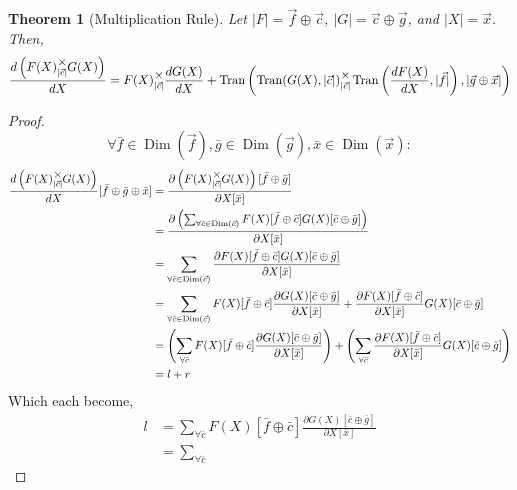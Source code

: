 \documentclass[12pt]{book}
\theoremstyle{definition}
\theoremstyle{plain}
\newtheorem{theorem}{Theorem}[chapter]
\theoremstyle{ppart}
\theoremstyle{case}
\theoremstyle{solution}
\DeclareMathOperator{\Dim}{Dim}
\DeclareMathOperator{\Tran}{Tran}
\newcommand{\mmult}[1]{\text{\raisebox{1ex}{$\underset{#1}{\times}$}}}
\begin{document}
\begin{landscape}
\begin{theorem}[Multiplication Rule]
\label{multiplication_rule}
Let $|F| = \vec{f} \oplus \vec{c}$, $|G| = \vec{c} \oplus \vec{g}$,
and $|X| = \vec{x}$. Then,
\begin{align*}
 \frac{d\left(F(X) \mmult{|\vec{c}|} G(X)\right)}{dX} =
 F(X) \mmult{|\vec{c}|} \frac{dG(X)}{dX} +
 \Tran\left(
   \Tran(G(X), |\vec{c}|)
     \mmult{|\vec{c}|}
   \Tran\left(\frac{dF(X)}{dX}, |\vec{f}|\right),
   |\vec{g} \oplus \vec{x}|
 \right)
\end{align*}
\end{theorem}
\begin{proof}
\[
 \forall
  \bar{f} \in \Dim(\vec{f}),
  \bar{g} \in \Dim(\vec{g}),
  \bar{x} \in \Dim(\vec{x})
 :
\]
\begin{align*}
 \frac{d\left(F(X) \mmult{|\vec{c}|} G(X)\right)}{dX}
  [\bar{f} \oplus \bar{g} \oplus \bar{x}]
 &= \frac{
       \partial \left(F(X) \mmult{|\vec{c}|} G(X)\right)[\bar{f} \oplus \bar{g}]
    }{
       \partial X[\bar{x}]
    } \\
 &= \frac{
       \partial \left(
        \sum_{\forall \bar{c} \in \Dim(\vec{c})}
         F(X)[\bar{f} \oplus \bar{c}] G(X)[\bar{c} \oplus \bar{g}]
      \right)
    }{
       \partial X[\bar{x}]
    } \\
 &= \sum_{\forall \bar{c} \in \Dim(\vec{c})}
    \frac{
      \partial F(X)[\bar{f} \oplus \bar{c}] G(X)[\bar{c} \oplus \bar{g}]
    }{
      \partial X[\bar{x}]
    }\\
 &= \sum_{\forall \bar{c} \in \Dim(\vec{c})}
    F(X)[\bar{f} \oplus \bar{c}]
    \frac{\partial G(X)[\bar{c} \oplus \bar{g}]}{\partial X[\bar{x}]}
    +
    \frac{\partial F(X)[\bar{f} \oplus \bar{c}]}{\partial X[\bar{x}]}
    G(X)[\bar{c} \oplus \bar{g}] \\
 &=
   \left(
    \sum_{\forall \bar{c}}
      F(X)[\bar{f} \oplus \bar{c}]
      \frac{\partial G(X)[\bar{c} \oplus \bar{g}]}{\partial X[\bar{x}]}
   \right)
   +
   \left(
    \sum_{\forall \bar{c}}
      \frac{\partial F(X)[\bar{f} \oplus \bar{c}]}{\partial X[\bar{x}]}
      G(X)[\bar{c} \oplus \bar{g}]
   \right) \\
 &=
    l + r
\end{align*}
Which each become,
\begin{align*}
 l
 &=
  \sum_{\forall \bar{c}}
    F(X)[\bar{f} \oplus \bar{c}]
    \frac{\partial G(X)[\bar{c} \oplus \bar{g}]}{\partial X[\bar{x}]} \\
 &=
  \sum_{\forall \bar{c}}

\end{align*}
\end{proof}
\end{landscape}
\end{document}
